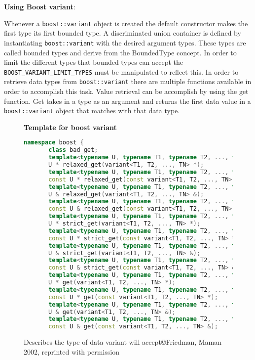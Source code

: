 \documentclass[letterpaper, 12pt]{article}
\newcommand{\inlinecode}[1]{\colorbox{codegrey}{\lstinline[language=C++]{#1}}}
\begin{document}
{\bfseries Using Boost variant}:
\par\vspace{\baselineskip}
Whenever a \inlinecode{boost::variant} object is created the default constructor makes the first type its first bounded type.
A discriminated union container is defined by instantiating \inlinecode{boost::variant} with the desired argument types.
These types are called bounded types and derive from the BoundedType concept. In order to limit the different
types that bounded types can accept the \inlinecode{BOOST_VARIANT_LIMIT_TYPES} must be manipulated to reflect this.
In order to retrieve data types from \inlinecode{boost::variant} there are multiple functions available in order to accomplish this task.
Value retrieval can be accomplish by using the get function. Get takes in a type as an argument and returns the first
data value in a \inlinecode{boost::variant} object that matches with that data type.
\par\vspace{\baselineskip}
\begin{figure}
  \centering
  \textbf{Template for boost variant}
   \begin{lstlisting}[language=C++,basicstyle=\tiny]
	   namespace boost {
	   class bad_get;
	   template<typename U, typename T1, typename T2, ..., typename TN> 
	   U * relaxed_get(variant<T1, T2, ..., TN> *);
	   template<typename U, typename T1, typename T2, ..., typename TN> 
	   const U * relaxed_get(const variant<T1, T2, ..., TN> *);
	   template<typename U, typename T1, typename T2, ..., typename TN> 
	   U & relaxed_get(variant<T1, T2, ..., TN> &);
	   template<typename U, typename T1, typename T2, ..., typename TN> 
	   const U & relaxed_get(const variant<T1, T2, ..., TN> &);
	   template<typename U, typename T1, typename T2, ..., typename TN> 
	   U * strict_get(variant<T1, T2, ..., TN> *);
	   template<typename U, typename T1, typename T2, ..., typename TN> 
	   const U * strict_get(const variant<T1, T2, ..., TN> *);
	   template<typename U, typename T1, typename T2, ..., typename TN> 
	   U & strict_get(variant<T1, T2, ..., TN> &);
	   template<typename U, typename T1, typename T2, ..., typename TN> 
	   const U & strict_get(const variant<T1, T2, ..., TN> &);
	   template<typename U, typename T1, typename T2, ..., typename TN> 
	   U * get(variant<T1, T2, ..., TN> *);
	   template<typename U, typename T1, typename T2, ..., typename TN> 
	   const U * get(const variant<T1, T2, ..., TN> *);
	   template<typename U, typename T1, typename T2, ..., typename TN> 
	   U & get(variant<T1, T2, ..., TN> &);
	   template<typename U, typename T1, typename T2, ..., typename TN> 
	   const U & get(const variant<T1, T2, ..., TN> &);
   \end{lstlisting}
  \cite{boostvariant}
  \caption{Describes the type of data variant will accept\copyright Friedman, Maman 2002, reprinted with permission} \label{templateboostvar}
\end{figure}
\end{document}
